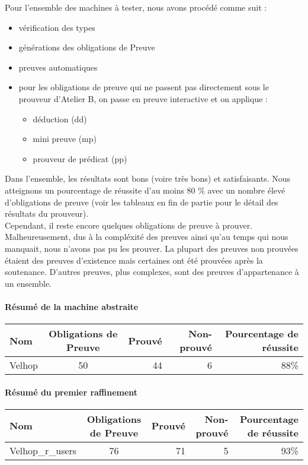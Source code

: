 \documentclass[12pt]{article}
\begin{document}
Pour l'ensemble des machines à tester, nous avons procédé comme suit :
\begin{itemize}
  \item vérification des types
  \item générations des obligations de Preuve
  \item preuves automatiques
  \item pour les obligations de preuve qui ne passent pas directement sous le prouveur d'Atelier B, on passe en preuve interactive et on applique :
  \begin{itemize}
    \item déduction (dd)
    \item mini preuve (mp)
    \item prouveur de prédicat (pp)
  \end{itemize}
\end{itemize}

Dans l'ensemble, les résultats sont bons (voire très bons) et satisfaisants. Nous atteignons un pourcentage de réussite d'au moins 80 \% avec un nombre élevé d'obligations de preuve (voir les tableaux en fin de partie pour le détail des résultats du prouveur).\\

Cependant, il reste encore quelques obligations de preuve à prouver. Malheureusement, dus à la compléxité des preuves ainsi qu'au temps qui nous manquait, nous n'avons pas pu les prouver. La plupart des preuves non prouvées étaient des preuves d'existence mais certaines ont été prouvées après la soutenance. D'autres preuves, plus complexes, sont des preuves d'appartenance à un ensemble.
\paragraph{Résumé de la machine abstraite}
\begin{center}
	\begin{tabular}{| l | c | r | r| r |}
		\hline
		Nom & Obligations de Preuve & Prouvé & Non-prouvé & Pourcentage de réussite \\ \hline
		Velhop & 50 & 44 & 6 & 88\% \\ \hline
	\end{tabular}
\end{center}

\paragraph{Résumé du premier raffinement}
\begin{center}
	\begin{tabular}{| l | c | r | r|r|}
		\hline
    Nom & Obligations de Preuve & Prouvé & Non-prouvé & Pourcentage de réussite\\ \hline
    Velhop\_r\_users & 76 & 71 & 5 & 93\% \\ \hline
	\end{tabular}
\end{center}
\end{document}
